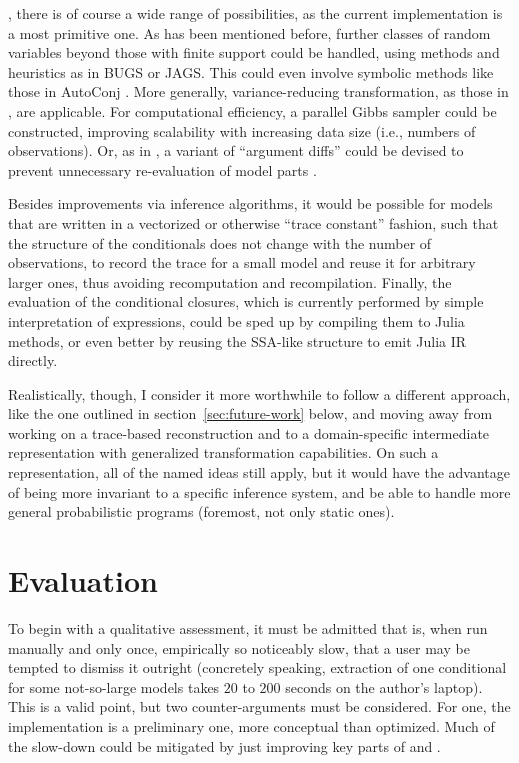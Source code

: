 , there is of course a wide range of possibilities, as the
current implementation is a most primitive one.  As has been mentioned before, further classes of
random variables beyond those with finite support could be handled, using methods and heuristics as
in BUGS or JAGS.  This could even involve symbolic methods like those in AutoConj
\parencite{hoffman2018autoconj}. More generally, variance-reducing transformation, as those in
\textcite{murray2017delayed}, are applicable.  For computational efficiency, a parallel Gibbs
sampler \parencite{gonzalez2011parallel} could be constructed, improving scalability with increasing
data size (i.e., numbers of observations).  Or, as in , a variant of
\enquote{argument diffs} could be devised to prevent unnecessary re-evaluation of model parts
\parencites[see][section 1.2.3]{cusumano-towner2020gen}{becker2020dynamic}.

Besides improvements via inference algorithms, it would be possible for models that are written in a
vectorized or otherwise \enquote{trace constant} fashion, such that the structure of the
conditionals does not change with the number of observations, to record the trace for a small model
and reuse it for arbitrary larger ones, thus avoiding recomputation and recompilation.  Finally, the
evaluation of the conditional closures, which is currently performed by simple interpretation of
expressions, could be sped up by compiling them to Julia methods, or even better by reusing the
SSA-like structure to emit Julia IR directly.

Realistically, though, I consider it more worthwhile to follow a different approach, like the one
outlined in section~\ref{sec:future-work} below, and moving away from working on a trace-based
reconstruction and to a domain-specific intermediate representation with generalized transformation
capabilities.  On such a representation, all of the named ideas still apply, but it would have the
advantage of being more invariant to a specific inference system, and be able to handle more general
probabilistic programs (foremost, not only static ones).


\section{Evaluation}
\label{sec:autogibbs-eval}

To begin with a qualitative assessment, it must be admitted that \autogibbsjl{} is, when run
manually and only once, empirically so noticeably slow, that a user may be tempted to dismiss it
outright (concretely speaking, extraction of one conditional for some not-so-large models takes
\(20\) to \(200\) seconds on the author's laptop).  This is a valid point, but two counter-arguments
must be considered.  For one, the implementation is a preliminary one, more conceptual than
optimized.  Much of the slow-down could be mitigated by just improving key parts of \autogibbsjl{}
and \irtrackerjl{}.

